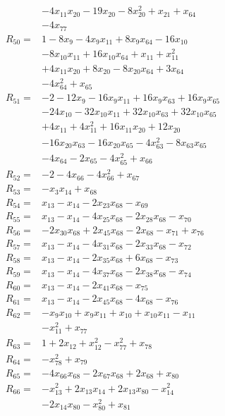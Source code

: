 \begin{align*}
&-4x_{11}x_{20} -19x_{20} -8x_{20}^{2} +x_{21} +x_{64}\\
&-4x_{77}\\[3pt]
R_{50}={}&1 -8x_{9} -4x_{9}x_{11} +8x_{9}x_{64} -16x_{10}\\
&-8x_{10}x_{11} +16x_{10}x_{64} +x_{11} +x_{11}^{2}\\
&+4x_{11}x_{20} +8x_{20} -8x_{20}x_{64} +3x_{64}\\
&-4x_{64}^{2} +x_{65}\\[3pt]
R_{51}={}&-2 -12x_{9} -16x_{9}x_{11} +16x_{9}x_{63} +16x_{9}x_{65}\\
&-24x_{10} -32x_{10}x_{11} +32x_{10}x_{63} +32x_{10}x_{65}\\
&+4x_{11} +4x_{11}^{2} +16x_{11}x_{20} +12x_{20}\\
&-16x_{20}x_{63} -16x_{20}x_{65} -4x_{63}^{2} -8x_{63}x_{65}\\
&-4x_{64} -2x_{65} -4x_{65}^{2} +x_{66}\\[3pt]
R_{52}={}&-2 -4x_{66} -4x_{66}^{2} +x_{67}\\[3pt]
R_{53}={}&-x_{3}x_{14} +x_{68}\\[3pt]
R_{54}={}&x_{13} -x_{14} -2x_{23}x_{68} -x_{69}\\[3pt]
R_{55}={}&x_{13} -x_{14} -4x_{25}x_{68} -2x_{28}x_{68} -x_{70}\\[3pt]
R_{56}={}&-2x_{30}x_{68} +2x_{45}x_{68} -2x_{68} -x_{71} +x_{76}\\[3pt]
R_{57}={}&x_{13} -x_{14} -4x_{31}x_{68} -2x_{33}x_{68} -x_{72}\\[3pt]
R_{58}={}&x_{13} -x_{14} -2x_{35}x_{68} +6x_{68} -x_{73}\\[3pt]
R_{59}={}&x_{13} -x_{14} -4x_{37}x_{68} -2x_{38}x_{68} -x_{74}\\[3pt]
R_{60}={}&x_{13} -x_{14} -2x_{41}x_{68} -x_{75}\\[3pt]
R_{61}={}&x_{13} -x_{14} -2x_{45}x_{68} -4x_{68} -x_{76}\\[3pt]
R_{62}={}&-x_{9}x_{10} +x_{9}x_{11} +x_{10} +x_{10}x_{11} -x_{11}\\
&-x_{11}^{2} +x_{77}\\[3pt]
R_{63}={}&1 +2x_{12} +x_{12}^{2} -x_{77}^{2} +x_{78}\\[3pt]
R_{64}={}&-x_{78}^{2} +x_{79}\\[3pt]
R_{65}={}&-4x_{66}x_{68} -2x_{67}x_{68} +2x_{68} +x_{80}\\[3pt]
R_{66}={}&-x_{13}^{2} +2x_{13}x_{14} +2x_{13}x_{80} -x_{14}^{2}\\
&-2x_{14}x_{80} -x_{80}^{2} +x_{81}\\[3pt]

\end{align*}
